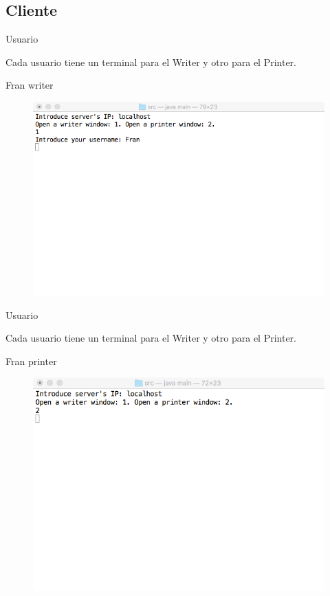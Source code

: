 \subsection{Cliente}
\begin{frame}{Usuario}
	\begin{block}{  }
		Cada usuario tiene un terminal para el Writer y otro para el Printer.
	\end{block}
	
	\begin{exampleblock}{Fran writer}
		\begin{figure}[H]
			\includegraphics[scale=0.4]{./Imagenes/franwriter1.png}
		\end{figure}
	\end{exampleblock}
\end{frame}




\begin{frame}{Usuario}
	\begin{block}{  }
		Cada usuario tiene un terminal para el Writer y otro para el Printer.
	\end{block}
	
	\begin{exampleblock}{Fran printer}
		\begin{figure}[H]
			\includegraphics[scale=0.4]{./Imagenes/franprinter1.png}
		\end{figure}
	\end{exampleblock}
\end{frame}


